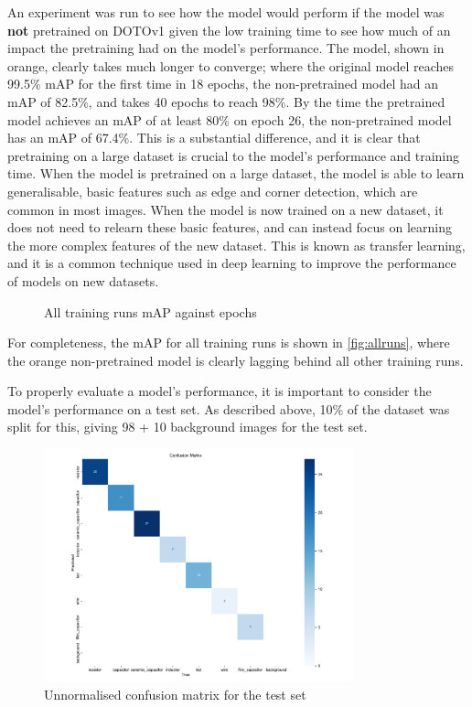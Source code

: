 An experiment was run to see how the model would perform if the model was \textbf{not} pretrained on DOTOv1 \cite{9560031} given the low training time to see how much of an impact the pretraining had on the model's performance. The model, shown in orange, clearly takes much longer to converge; where the original model reaches 99.5\% mAP for the first time in 18 epochs, the non-pretrained model had an mAP of 82.5\%, and takes 40 epochs to reach 98\%. By the time the pretrained model achieves an mAP of at least 80\% on epoch 26, the non-pretrained model has an mAP of 67.4\%. This is a substantial difference, and it is clear that pretraining on a large dataset is crucial to the model's performance and training time. When the model is pretrained on a large dataset, the model is able to learn generalisable, basic features such as edge and corner detection, which are common in most images. When the model is now trained on a new dataset, it does not need to relearn these basic features, and can instead focus on learning the more complex features of the new dataset. This is known as transfer learning, and it is a common technique used in deep learning to improve the performance of models on new datasets.

\begin{figure}[H]
  \centering
  
  \caption{All training runs mAP against epochs}
  \label{fig:allruns}
\end{figure}

For completeness, the mAP for all training runs is shown in \autoref{fig:allruns}, where the orange non-pretrained model is clearly lagging behind all other training runs.

To properly evaluate a model's performance, it is important to consider the model's performance on a test set. As described above, 10\% of the dataset was split for this, giving 98 + 10 background images for the test set.

\begin{figure}[H]
  \centering
  \includegraphics[width=0.8\textwidth]{imgs/graphs/confusion_matrix_final.png}
  \caption{Unnormalised confusion matrix for the test set}
  \label{fig:true-confusion-matrix}
\end{figure}

